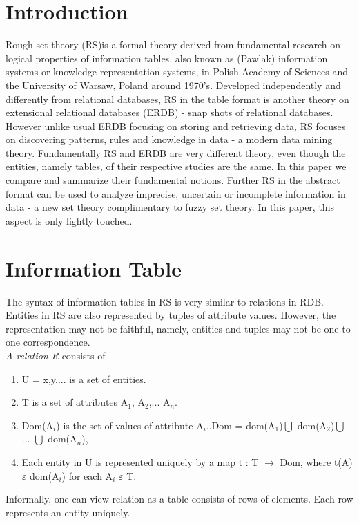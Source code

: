 \documentclass[12pt]{article}
\begin{document}
\section{Introduction}\label{sec1}
Rough set theory (RS)is a formal theory derived from
fundamental research on logical properties of information
tables, also known as (Pawlak) information systems or knowledge
representation systems, in Polish Academy of Sciences and the
University of Warsaw, Poland around 1970's. Developed
independently and differently from relational databases, RS in
the table format is another theory on extensional relational
databases (ERDB) - snap shots of relational databases. However
unlike usual ERDB  focusing on storing and retrieving data, RS
focuses on discovering patterns, rules and knowledge in data -
a modern data mining theory. Fundamentally RS and ERDB are very
different theory, even though the entities, namely tables, of
their respective studies are the same. In this paper we compare
and summarize their fundamental notions. Further RS in the
abstract format can be used to analyze imprecise, uncertain or
incomplete information in data - a new set theory complimentary
to fuzzy set theory. In this paper, this aspect is only
lightly touched.\\
\section{Information Table}\label{sec2}
The syntax of information tables in RS is very similar to
relations in RDB. Entities in RS are also represented by tuples
of attribute values. However, the representation may not be
faithful, namely, entities and tuples may not be one to one
correspondence.\\
\textit{A relation R} consists of
\begin{enumerate}
  \item U = {x,y....} is a set of entities.
  \item T is a set of attributes {A$_{1}$, A$_{2}$,...
      A$_{n}$}.
  \item Dom(A$_{i}$) is the set of values of attribute
      A$_{i}$..Dom = dom(A$_{1}$)$\bigcup$
      dom(A$_{2}$)$\bigcup$... $\bigcup$ dom(A$_{n}$),
  \item Each entity in U is represented uniquely by a map
		 t : T $\rightarrow$  Dom, where  t(A)
$\varepsilon$ dom(A$_{i}$)  for each A$_{i}$ $\varepsilon$
T.
\end{enumerate}
Informally, one can view relation as a table consists of rows
of elements. Each row represents an entity uniquely.
\end{document}
